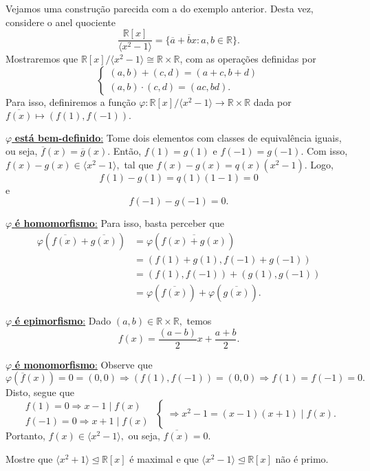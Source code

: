 \documentclass[algebraII_notes.tex]{subfiles}
\begin{document}
\begin{example}
	Vejamos uma construção parecida com a do exemplo anterior. Desta vez, considere o anel quociente
	\[
		\frac{\mathbb{R}[x]}{\langle x^{2}-1 \rangle} = \{\overline{a}+\overline{b}x:a, b\in \mathbb{R}\}.
	\]
	Mostraremos que \(\mathbb{R}[x]/\langle x^{2}-1 \rangle\cong{\mathbb{R}\times \mathbb{R}}\), com as operações definidas por
	\[
		\left\{\begin{array}{ll}
			(a, b) + (c, d) = (a + c, b + d) \\
			(a, b) \cdot (c, d) = (ac, bd).
		\end{array}\right.
	\]
	Para isso, definiremos a função \(\varphi :\mathbb{R}[x]/\langle x^{2}-1 \rangle\rightarrow \mathbb{R}\times \mathbb{R}\) dada por \(\overline{f(x)}\mapsto (f(1), f(-1)).\)

	\underline{ \(\varphi \)\textbf{ está bem-definido}:} Tome dois elementos com classes de equivalência iguais, ou seja,
	\(\overline{f}(x) = \overline{g}(x)\). Então, \(f(1) = g(1) \) e \(f(-1) = g(-1)\). Com isso,
	\(f(x) - g(x)\in \langle x^{2} - 1 \rangle,\) tal que \(f(x) - g(x) = q(x)(x^{2}-1)\). Logo,
	\[
		f(1) - g(1) = q(1)(1-1) = 0
	\]
	e
	\[
		f(-1)-g(-1) = 0.
	\]

	\underline{\(\varphi\) \textbf{ é homomorfismo}:} Para isso, basta perceber que
	\begin{align*}
		\varphi (\overline{f(x)} + \overline{g(x)}) & = \varphi (\overline{f(x)+g(x)})                         \\
		                                            & = (f(1) + g(1), f(-1)+g(-1))                             \\
		                                            & = (f(1), f(-1)) + (g(1), g(-1))                          \\
		                                            & = \varphi (\overline{f(x)}) + \varphi (\overline{g(x)}).
	\end{align*}

	\underline{\(\varphi \)\textbf{ é epimorfismo}:} Dado \((a, b)\in \mathbb{R}\times \mathbb{R},\) temos
	\[
		f(x) = \frac{(a-b)}{2}x + \frac{a+b}{2}.
	\]

	\underline{\(\varphi \)\textbf{ é monomorfismo}:} Observe que
	\[
		\varphi (\overline{f}(x)) = 0 = (0, 0) \Rightarrow (f(1), f(-1)) = (0, 0) \Rightarrow f(1) = f(-1) = 0.
	\]
	Disto, segue que
	\[
		\left.\begin{array}{ll}
			f(1) = 0 \Rightarrow x-1\mid f(x) \\
			f(-1) = 0 \Rightarrow x+1\mid f(x)
		\end{array}\right\{ \Rightarrow x^{2}-1 = (x-1)(x+1)\mid f(x).
	\]
	Portanto, \(f(x)\in \langle x^{2}-1 \rangle,\) ou seja, \(\overline{f(x)} = 0.\)
\end{example}
\begin{example}[Exercícios]
	Mostre que \(\langle x^{2} + 1 \rangle \trianglelefteq \mathbb{R}[x]\) é maximal e que \(\langle x^{2}-1 \rangle \trianglelefteq \mathbb{R}[x]\) não é primo.
\end{example}
\end{document}
